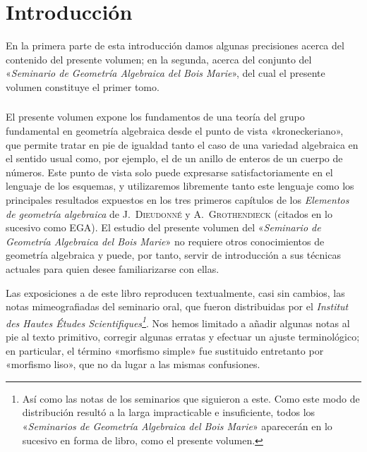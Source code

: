 \renewcommand{\baselinestretch}{1.1}\normalfont
\chapter*{Introducción}
\thispagestyle{empty}
\label{I.0}

En la primera parte de esta introducción damos algunas precisiones acerca del contenido del presente volumen; en la segunda, acerca del conjunto del «\emph{Seminario de Geometría Algebraica del Bois Marie}», del cual el presente volumen constituye el primer tomo.

\let\oldthesubsection\thesubsection
\renewcommand{\thesubsection}{\arabic{subsection}}
\setcounter{secnumdepth}{2}
\subsection{}
\label{I.introduction.1}

El presente volumen expone los fundamentos de una teoría del grupo fundamental en geometría algebraica desde el punto de vista «kroneckeriano», que permite tratar en pie de igualdad tanto el caso de una variedad algebraica en el sentido usual como, por ejemplo, el de un anillo de enteros de un cuerpo de números. Este punto de vista solo puede expresarse satisfactoriamente en el lenguaje de los esquemas, y utilizaremos libremente tanto este lenguaje como los principales resultados expuestos en los tres primeros capítulos de los \emph{Elementos de geometría algebraica} de J.\ \textsc{Dieudonné} y A.\ \textsc{Grothendieck} (citados en lo sucesivo como EGA). El estudio del presente volumen del «\emph{Seminario de Geometría Algebraica del Bois Marie}» no requiere otros conocimientos de geometría algebraica y puede, por tanto, servir de introducción a sus técnicas actuales para quien desee familiarizarse con ellas.

Las exposiciones  a  de este libro reproducen textualmente, casi sin cambios, las notas mimeografiadas del seminario oral, que fueron distribuidas por el \emph{Institut des Hautes Études Scientifiques\footnote{Así como las notas de los seminarios que siguieron a este. Como este modo de distribución resultó a la larga impracticable e insuficiente, todos los «\emph{Seminarios de Geometría Algebraica del Bois Marie}» aparecerán en lo sucesivo en forma de libro, como el presente volumen.}}. Nos hemos limitado a añadir algunas notas al pie al texto primitivo, corregir algunas erratas y efectuar un ajuste terminológico; en particular, el término «morfismo simple» fue sustituido entretanto por «morfismo liso», que no da lugar a las mismas confusiones.

